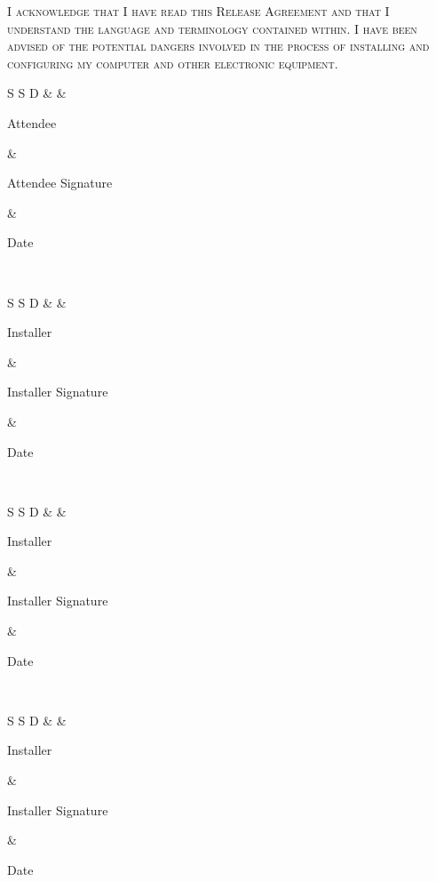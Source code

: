 \documentclass[11pt,draft]{article}
\newenvironment{grayout}{\color{gray}}{\ignorespacesafterend}
\newcommand{\printsigndate}[1]{%
    \vspace{5mm}
    \begin{tabularx}{\textwidth}{S S D}
        \hrulefill{} & \hrulefill{} & \hrulefill{} \\
        \strut{}#1\strut{}&
        \strut{}#1 Signature\strut{}&
        \strut{}Date\strut{}
    \end{tabularx}%
}
\def\AnInstaller{Installer}
\begin{document}
\vfill

{\scshape I acknowledge that I have read this Release Agreement and that
    I understand the language and terminology contained within. I have
    been advised of the potential dangers involved in the process of
    installing and configuring my computer and other electronic
    equipment.
}

\begin{flushright}
\printsigndate{Attendee} \\
\printsigndate{\AnInstaller} \\
\begin{grayout}
\printsigndate{\AnInstaller} \\
\printsigndate{\AnInstaller}
\end{grayout}
\end{flushright}
\end{document}
